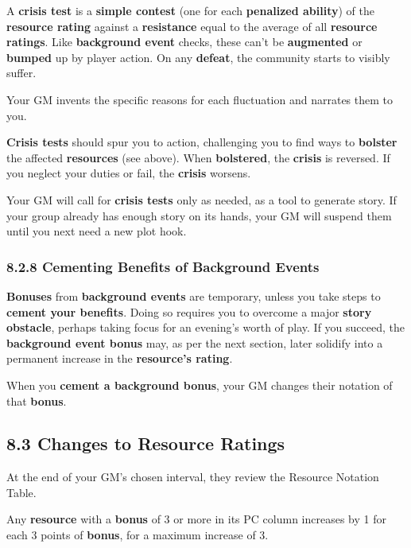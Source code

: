 \documentclass[
]{article}
\begin{document}
A \textbf{crisis test} is a \textbf{simple contest} (one for each
\textbf{penalized ability}) of the \textbf{resource rating} against a
\textbf{resistance} equal to the average of all \textbf{resource
ratings}. Like \textbf{background event} checks, these can't be
\textbf{augmented} or \textbf{bumped} up by player action. On any
\textbf{defeat}, the community starts to visibly suffer.

Your GM invents the specific reasons for each fluctuation and narrates
them to you.

\textbf{Crisis tests} should spur you to action, challenging you to find
ways to \textbf{bolster} the affected \textbf{resources} (see above).
When \textbf{bolstered}, the \textbf{crisis} is reversed. If you neglect
your duties or fail, the \textbf{crisis} worsens.

Your GM will call for \textbf{crisis tests} only as needed, as a tool to
generate story. If your group already has enough story on its hands,
your GM will suspend them until you next need a new plot hook.

\hypertarget{cementing-benefits-of-background-events}{%
\subsubsection{8.2.8 Cementing Benefits of Background
Events}\label{cementing-benefits-of-background-events}}

\textbf{Bonuses} from \textbf{background events} are temporary, unless
you take steps to \textbf{cement your benefits}. Doing so requires you
to overcome a major \textbf{story obstacle}, perhaps taking focus for an
evening's worth of play. If you succeed, the \textbf{background event
bonus} may, as per the next section, later solidify into a permanent
increase in the \textbf{resource's rating}.

When you \textbf{cement a background bonus}, your GM changes their
notation of that \textbf{bonus}.

\hypertarget{changes-to-resource-ratings}{%
\subsection{8.3 Changes to Resource
Ratings}\label{changes-to-resource-ratings}}

At the end of your GM's chosen interval, they review the Resource
Notation Table.

Any \textbf{resource} with a \textbf{bonus} of 3 or more in its PC
column increases by 1 for each 3 points of \textbf{bonus}, for a maximum
increase of 3.
\end{document}
